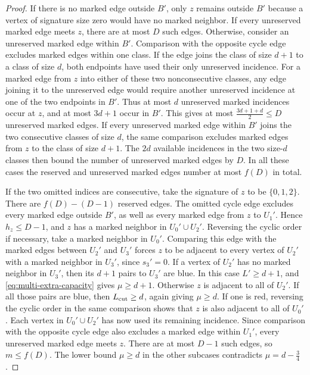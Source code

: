 \documentclass[preprint,11pt,numbers]{elsarticle-arxiv}
\numberwithin{equation}{section}
\theoremstyle{definition}
\begin{document}
\begin{proof}
If there is no marked edge outside $B'$, only $z$ remains
outside $B'$ because a vertex of signature size zero would have
no marked neighbor. If every unreserved marked edge meets $z$,
there are at most $D$ such edges. Otherwise, consider an
unreserved marked edge within $B'$. Comparison with the opposite
cycle edge excludes marked edges within one class. If the edge
joins the class of size $d+1$ to a class of size $d$, both
endpoints have used their only unreserved incidence. For a marked
edge from $z$ into either of these two nonconsecutive classes,
any edge joining it to the unreserved edge would require another
unreserved incidence at one of the two endpoints in $B'$.
Thus at most $d$
unreserved marked incidences occur at $z$, and at most $3d+1$
occur in $B'$. This gives at most $\frac{3d+1+d}{2}\le D$
unreserved marked edges. If every unreserved marked edge within
$B'$ joins the two consecutive classes of size $d$, the same
comparison excludes marked edges from $z$ to the class of
size $d+1$. The $2d$ available incidences in the two size-$d$
classes then bound the number of unreserved marked edges by $D$.
In all these cases the reserved and unreserved marked edges
number at most $f(D)$ in total.

If the two omitted indices are consecutive, take the signature
of $z$ to be $\{0,1,2\}$. There are $f(D)-(D-1)$ reserved
edges. The omitted cycle edge excludes every marked edge outside
$B'$, as well as every marked edge from $z$ to $U_1'$. Hence
$h_z\le D-1$, and $z$ has a marked neighbor in $U_0'\cup U_2'$.
Reversing the cyclic order if necessary, take a marked neighbor
in $U_0'$. Comparing this edge with the marked edges between
$U_2'$ and $U_3'$ forces $z$ to be adjacent to every vertex of
$U_2'$ with a marked neighbor in $U_3'$, since $s_3'=0$.
If a vertex of $U_2'$ has no marked neighbor in $U_3'$, then
its $d+1$ pairs to $U_3'$ are blue. In this case $L'\ge d+1$,
and \eqref{eq:multi-extra-capacity} gives $\mu\ge d+1$.
Otherwise $z$ is adjacent to all of $U_2'$. If all those pairs
are blue, then $L_{\rm cut}\ge d$, again giving $\mu\ge d$.
If one is red, reversing the cyclic order in the same comparison
shows that $z$ is also adjacent to all of $U_0'$. Each vertex
in $U_0'\cup U_2'$ has now used its remaining incidence.
Since comparison with the opposite cycle edge also excludes a
marked edge within $U_1'$, every unreserved marked edge meets
$z$. There are at most $D-1$ such edges, so $m\le f(D)$.
The lower bound $\mu\ge d$ in the other subcases contradicts
$\mu=d-\frac{3}{4}$.


\end{proof}
\end{document}
